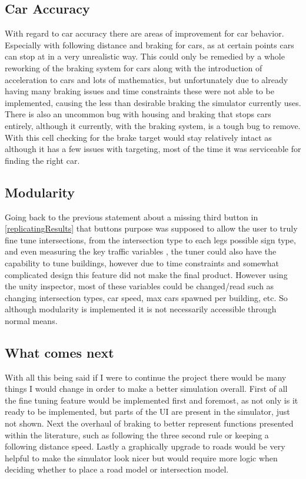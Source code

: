 \documentclass[10pt,twocolumn]{article}
\begin{document}
\subsection{Car Accuracy}
With regard to car accuracy there are areas of improvement for car behavior. Especially with following distance and braking for cars, as at certain points cars can stop at in a very unrealistic way. This could only be remedied by a whole reworking of the braking system for cars along with the introduction of acceleration to cars and lots of mathematics, but unfortunately due to already having many braking issues and time constraints these were not able to be implemented, causing the less than desirable braking the simulator currently uses. There is also an uncommon bug with housing and braking that stops cars entirely, although it currently, with the braking system, is a tough bug to remove. With this cell checking for the brake target would stay relatively intact as although it has a few issues with targeting, most of the time it was serviceable for finding the right car.
\subsection{Modularity}
Going back to the previous statement about a missing third button in \ref{replicatingResults} that buttons purpose was supposed to allow the user to truly fine tune intersections, from the intersection type to each legs possible sign type, and even measuring the key traffic variables \cite{roadTrafficModeling}, the tuner could also have the capability to tune buildings, however due to time constraints and somewhat complicated design this feature did not make the final product. However using the unity inspector, most of these variables could be changed/read such as changing intersection types, car speed, max cars spawned per building, etc. So although modularity is implemented it is not necessarily accessible through normal means.
\subsection{What comes next}
With all this being said if I were to continue the project there would be many things I would change in order to make a better simulation overall. First of all the fine tuning feature would be implemented first and foremost, as not only is it ready to be implemented, but parts of the UI are present in the simulator, just not shown. Next the overhaul of braking to better represent functions presented within the literature, such as following the three second rule or keeping a following distance speed. Lastly a graphically upgrade to roads would be very helpful to make the simulator look nicer but would require more logic when deciding whether to place a road model or intersection model.
\end{document}
